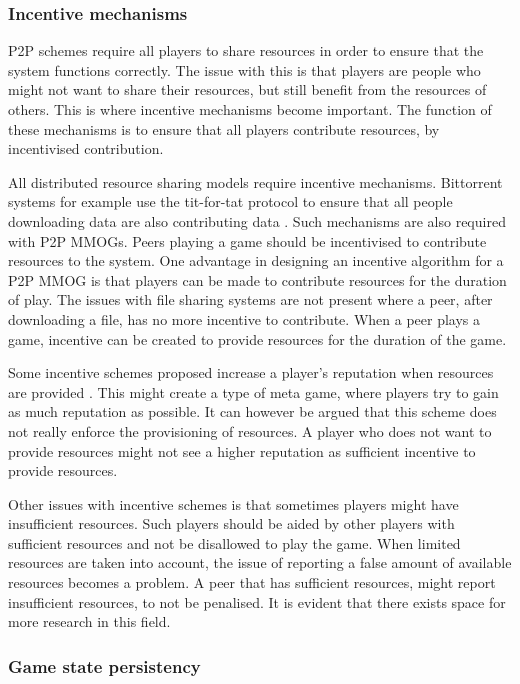 \documentclass[10pt,a4paper,journal,cspaper,compsoc]{IEEEtran}
\begin{document}
\subsubsection{Incentive mechanisms}

P2P schemes require all players to share resources in order to ensure that the system functions correctly. The issue with this is that players are
people who might not want to share their resources, but still benefit from the resources of others. This is where incentive mechanisms become
important. The function of these mechanisms is to ensure that all players contribute resources, by incentivised contribution.

All distributed resource sharing models require incentive mechanisms. Bittorrent systems for example use the tit-for-tat protocol to ensure that all
people downloading data are also contributing data \cite{tit_for_tat}. Such mechanisms are also required with P2P MMOGs. Peers playing a game should
be incentivised to contribute resources to the system. One advantage in designing an incentive algorithm for a P2P MMOG is that players can be made
to contribute resources for the duration of play. The issues with file sharing systems are not present where a peer, after downloading a file, has no
more incentive to contribute. When a peer plays a game, incentive can be created to provide resources for the duration of the game.

Some incentive schemes proposed increase a player's reputation when resources are provided \cite{classic_p2p_reputation} \cite{proactive_reputation}.
This might create a type of meta game, where players try to gain as much reputation as possible. It can however be argued that this scheme does not
really enforce the provisioning of resources. A player who does not want to provide resources might not see a higher reputation as sufficient
incentive to provide resources.

Other issues with incentive schemes is that sometimes players might have insufficient resources. Such players should be aided by other players with
sufficient resources and not be disallowed to play the game. When limited resources are taken into account, the issue of reporting a false amount of
available resources becomes a problem. A peer that has sufficient resources, might report insufficient resources, to not be penalised. It is evident
that there exists space for more research in this field.

\subsubsection{Game state persistency}
\end{document}
